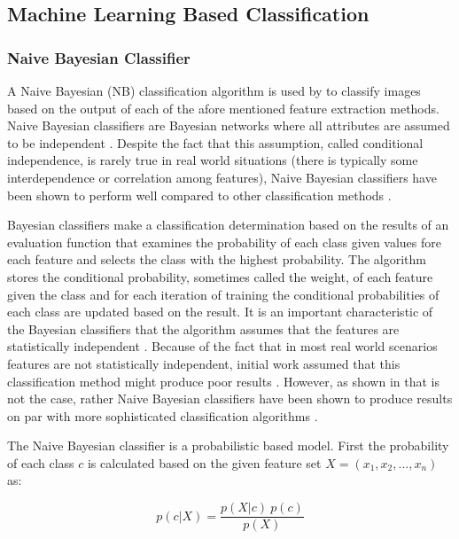 \documentclass{IEEEtran}
\begin{document}
\subsection{Machine Learning Based Classification} \label{3-LBC}
\subsubsection{Naive Bayesian Classifier}
A Naive Bayesian (NB) classification algorithm is used by \cite{lajevardi2012automatic} to classify images based on the output of each of the afore mentioned feature extraction methods. Naive Bayesian classifiers are Bayesian networks where all attributes are assumed to be independent \cite{zhang2004optimality}. Despite the fact that this assumption, called conditional independence, is rarely true in real world situations (there is typically some interdependence or correlation among features), Naive Bayesian classifiers have been shown to perform well compared to other classification methods \cite{zhang2004optimality}.

Bayesian classifiers make a classification determination based on the results of an evaluation function that examines the probability of each class given values fore each feature and selects the class with the highest probability. The algorithm stores the conditional probability, sometimes called the weight, of each feature given the class and for each iteration of training the conditional probabilities of each class are updated based on the result. It is an important characteristic of the Bayesian classifiers that the algorithm assumes that the features are statistically independent \cite{langley1992analysis}. Because of the fact that in most real world scenarios features are not statistically independent, initial work assumed that this classification method might produce poor results \cite{zhang2004optimality} \cite{langley1992analysis}. However, as shown in \cite{zhang2004optimality} that is not the case, rather Naive Bayesian classifiers have been shown to produce results on par with more sophisticated classification algorithms \cite{zhang2004optimality}.


The Naive Bayesian classifier is a probabilistic based model. First the probability of each class $c$ is calculated based on the given feature set $X = (x_1,x_2,...,x_n)$ as:

\begin{equation}
\label{eqn_nb_pclassGivenFeat}
p(c|X) = \frac{p(X|c)\:p(c)}{p(X)}
\end{equation}
\end{document}
